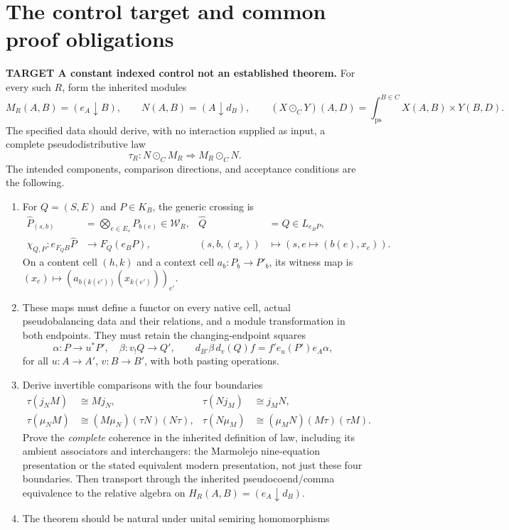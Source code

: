 \documentclass[11pt,a4paper]{article}
\newcommand{\W}{\mathcal W_R}
\newcommand{\psint}{\int_{\mathrm{ps}}}
\newcommand{\status}[1]{\textbf{#1.}}
\begin{document}
\section{The control target and common proof obligations}

\status{TARGET A constant indexed control not an established theorem}
For every such $R$, form the inherited modules
\[
 M_R(A,B)=(e_A\downarrow B),\qquad
 N(A,B)=(A\downarrow d_B),\qquad
 (X\odot_CY)(A,D)=\psint^{B\in C}X(A,B)\times Y(B,D).
\]
The specified data should derive, with no interaction supplied as input,
a complete pseudodistributive law
\[
 \tau_R:N\odot_CM_R\Longrightarrow M_R\odot_CN.
\]
The intended components, comparison directions, and acceptance conditions
are the following.

\begin{enumerate}
\item For $Q=(S,E)$ and $P\in K_B$, the generic crossing is
\begin{align*}
 \widehat P_{(s,b)}&=\bigotimes_{e\in E_s}P_{b(e)}\in\W,
 &\widehat Q&=Q\in L_{e_BP},\\
 \chi_{Q,P}:e_{F_QB}\widehat P&\longrightarrow F_Q(e_BP),
 &(s,b,(x_e))&\longmapsto(s,e\mapsto(b(e),x_e)).
\end{align*}
On a content cell $(h,k)$ and a context cell $a_b:P_b\to P'_b$, its
witness map is $(x_e)\mapsto(a_{b(k(e'))}(x_{k(e')}))_{e'}$.
\item These maps must define a functor on every native cell, actual
pseudobalancing data and their relations, and a module transformation in
both endpoints. They must retain the changing-endpoint squares
\[
 \alpha:P\to u^*P',\quad \beta:v_!Q\to Q',\qquad
 d_{B'}\beta\,d_v(Q)f=f'e_u(P')e_A\alpha,
\]
for all $u:A\to A'$, $v:B\to B'$, with both pasting operations.
\item Derive invertible comparisons with the four boundaries
\begin{align*}
 \tau(j_NM)&\cong Mj_N,&\tau(Nj_M)&\cong j_MN,\\
 \tau(\mu_NM)&\cong(M\mu_N)(\tau N)(N\tau),&
 \tau(N\mu_M)&\cong(\mu_MN)(M\tau)(\tau M).
\end{align*}
Prove the \emph{complete} coherence in the inherited definition of law,
including its ambient associators and interchangers: the Marmolejo
nine-equation presentation or the stated equivalent modern presentation,
not just these four boundaries. Then transport through the inherited
pseudocoend/comma equivalence to the relative algebra on
$H_R(A,B)=(e_A\downarrow d_B)$.
\item The theorem should be natural under unital semiring homomorphisms

\end{enumerate}
\end{document}
